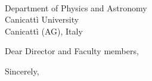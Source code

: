 \documentclass[letterpaper,12pt]{letter}
\begin{document}

\date{19 January 2038}

\signature{Dr. Andrea Capra\\
           Associate Research Scientist}

\begin{letter}{\\Department of Physics and Astronomy\\Canicatt\`i University\\Canicatt\`i (AG), Italy}
\opening{Dear Director and Faculty members,}

\lipsum[2-4]

\lipsum[5]

\closing{Sincerely,}

\end{letter}
\end{document}
